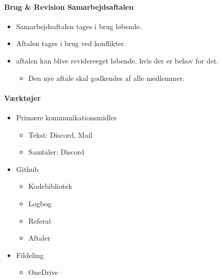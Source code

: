 \paragraph{Brug \& Revision Samarbejdsaftalen}
\begin{itemize}
    \item Samarbejdsaftalen tages i brug løbende.
    \item Aftalen tages i brug ved konflikter.
    \item aftalen kan blive revidereeget løbende, hvis der er behov for det.
    \begin{itemize}
        \item Den nye aftale skal godkendes af alle medlemmer.
    \end{itemize}
\end{itemize}

\paragraph{Værktøjer}
\begin{itemize}
    \item Primære kommunikationsmidler
    \begin{itemize}
        \item Tekst: Discord, Mail
        \item Samtaler: Discord
    \end{itemize}
    \item Github
    \begin{itemize}
        \item Kodebibliotek
        \item Logbog
        \item Referat
        \item Aftaler
    \end{itemize}
    \item Fildeling
    \begin{itemize}
        \item OneDrive
    \end{itemize}
\end{itemize}


